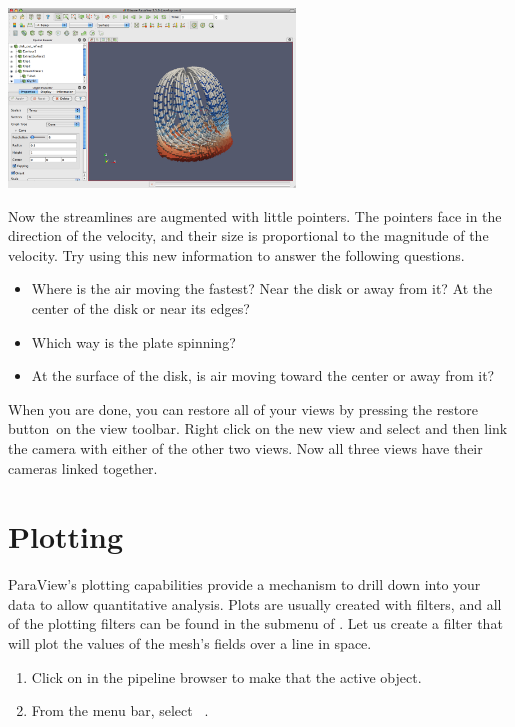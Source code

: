\begin{inlinefig}
  \includegraphics[width=3in]{images/StreamTracer2}
\end{inlinefig}

Now the streamlines are augmented with little pointers.  The pointers face
in the direction of the velocity, and their size is proportional to the
magnitude of the velocity.  Try using this new information to answer the
following questions.

\begin{itemize}
\item Where is the air moving the fastest?  Near the disk or away from it?
  At the center of the disk or near its edges?
\item Which way is the plate spinning?
\item At the surface of the disk, is air moving toward the center or away
  from it?
\end{itemize}

When you are done, you can restore all of your views by pressing the
restore button~\restoreView on the view toolbar.  Right click on the new
view and select  and then link the camera with either
of the other two views.  Now all three views have their cameras linked
together.


\section{Plotting}

ParaView's plotting capabilities provide a mechanism to drill down into
your data to allow quantitative analysis.  Plots are usually created with
filters, and all of the plotting filters can be found in the  submenu of .  Let us create a filter that will
plot the values of the mesh’s fields over a line in space.

\begin{enumerate}
\item Click on  in the pipeline browser to make
  that the active object.
\item From the menu bar, select  \ra {} \ra
  ~. 
  \savecounter
\end{enumerate}

